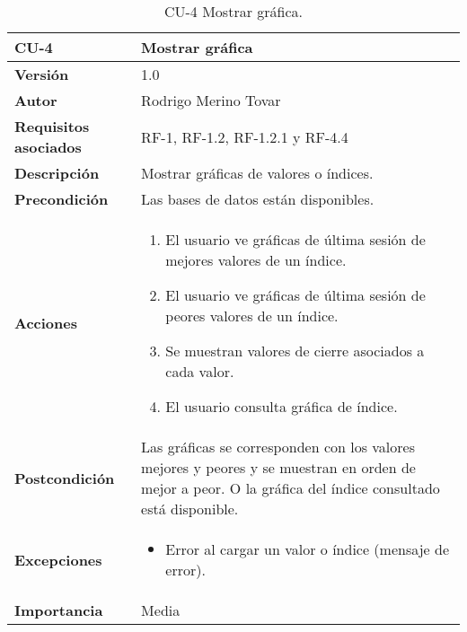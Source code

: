 \begin{table}[p]
	\centering
	\begin{tabularx}{\linewidth}{ p{} p{} }
		\toprule
		\textbf{CU-4}    & \textbf{Mostrar gráfica}\\
		\toprule
		\textbf{Versión}              & 1.0    \\
		\textbf{Autor}                & Rodrigo Merino Tovar \\
		\textbf{Requisitos asociados} & RF-1, RF-1.2, RF-1.2.1 y RF-4.4 \\
		\textbf{Descripción}          & Mostrar gráficas de valores o índices.\\
		\textbf{Precondición}         & Las bases de datos están disponibles. \\
		\textbf{Acciones}             &
		\begin{enumerate}
			\def\labelenumi{\arabic{enumi}.}
			\tightlist
			\item El usuario ve gráficas de última sesión de mejores valores de un 						índice. 
			\item El usuario ve gráficas de última sesión de peores valores de un 						índice. 
			\item Se muestran valores de cierre asociados a cada valor.
			\item El usuario consulta gráfica de índice.
		\end{enumerate}\\
		\textbf{Postcondición}        & Las gráficas se corresponden con los valores 												mejores y peores y se muestran en orden de mejor a peor. O la gráfica del índice consultado está disponible. \\
		\textbf{Excepciones}          & 
		\begin{itemize}
			\tightlist
			\item Error al cargar un valor o índice (mensaje de error). 
		\end{itemize}\\
		\textbf{Importancia}          & Media \\
		\bottomrule
	\end{tabularx}
	\caption{CU-4 Mostrar gráfica.}
\end{table}


